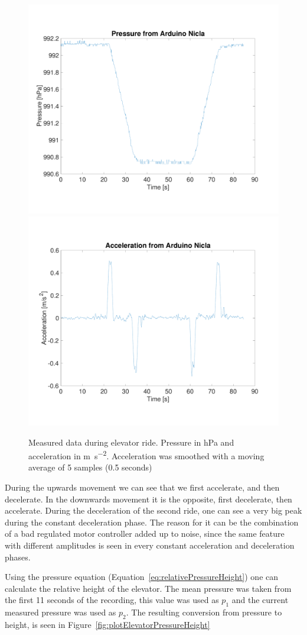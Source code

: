 \documentclass[DIV=14]{scrartcl}
\begin{document}
    \begin{figure}[h]
        \centering
        \includegraphics[width=.5\textwidth]{plots/plotElevatorPressure}\hfill
        \includegraphics[width=.5\textwidth]{plots/plotElevatorAcceleration}\hfill
        \caption{Measured data during elevator ride. Pressure in \si{\hecto\pascal} and acceleration in
        \si{\meter\per\second\squared}. Acceleration was smoothed with a moving average of 5 samples (0.5 seconds)}
        \label{fig:plotElevatorRaw}
    \end{figure}

    During the upwards movement we can see that we first accelerate, and then decelerate.
    In the downwards movement it is the opposite, first decelerate, then accelerate.
    During the deceleration of the second ride, one can see a very big peak during the constant deceleration phase.
    The reason for it can be the combination of a bad regulated motor controller added up to noise,
    since the same feature with different amplitudes is seen in every constant acceleration and deceleration phases.

    Using the pressure equation (Equation~\ref{eq:relativePressureHeight}) one can calculate the relative height of the
    elevator.
    The mean pressure was taken from the first 11 seconds of the recording, this value was used as $p_1$ and the current
    measured pressure was used as $p_2$.
    The resulting conversion from pressure to height, is seen in Figure~\ref{fig:plotElevatorPressureHeight}
\end{document}
